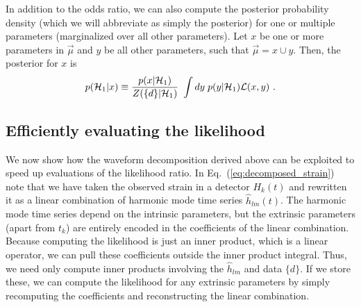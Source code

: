 In addition to the odds ratio, we can also compute the posterior probability density 
(which we will abbreviate as simply the posterior)
for one or multiple parameters (marginalized over all other parameters). Let $x$ be one or more parameters in
$\vec{\mu}$ and $y$ be all other parameters, such that $\vec{\mu} = x \cup y$. Then, the posterior for $x$ is
\begin{equation} \label{eq:def:Posterior}
p({\cal H}_1|x) \equiv \frac{p(x|{\cal H}_1)}{Z(\{d\}|{\cal H}_1)} \ \int dy \;  p(y|{\cal H}_1) \Like(x,y)\ .
\end{equation}

\subsection{Efficiently evaluating the likelihood}

We now show how the waveform decomposition derived above can be exploited
to speed up evaluations of the likelihood ratio.
In Eq.~(\ref{eq:decomposed_strain}) note that we have taken the observed strain in a detector $H_k(t)$
and rewritten it as a linear combination of harmonic mode time series $\hat{h}_{lm}(t)$.
The harmonic mode time series depend on the intrinsic parameters, but
the extrinsic parameters (apart from $t_k$) are entirely encoded in the coefficients of the linear combination.
Because computing the likelihood is just an inner product, which is a linear operator, 
we can pull these coefficients outside the inner product integral.
Thus, we need only compute inner products involving the $\hat{h}_{lm}$ and data $\{d\}$. 
If we store these, we can compute the likelihood for any extrinsic parameters by simply
recomputing the coefficients and reconstructing the linear combination.

